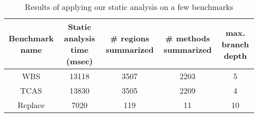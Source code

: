 \begin{table}[]
    \centering
    \begin{tabular}{|c|c|c|c|c|}
        \hline
        Benchmark name & Static analysis time (msec) & \# regions summarized & \# methods summarized & max. branch depth \\ \hline
        WBS            & 13118                       & 3507                  & 2203                  & 5                 \\ \hline
        TCAS           & 13830                       & 3505                  & 2209                  & 4                 \\ \hline
        Replace        & 7020                        & 119                   & 11                    & 10                \\ \hline
    \end{tabular}
    \caption{Results of applying our static analysis on a few benchmarks}
    \label{table:static-analysis}
\end{table}